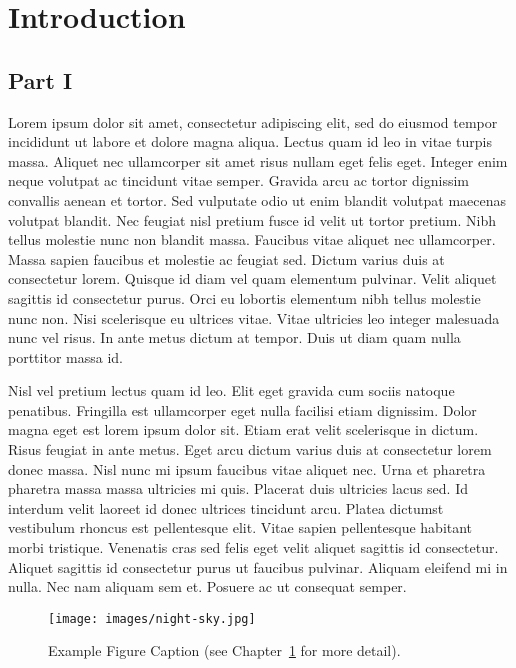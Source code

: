 \documentclass[
  11pt,
  letterpaper,
]{book}
\begin{document}

\hypertarget{sec-intro}{%
\chapter{Introduction}\label{sec-intro}}

\hypertarget{part-i}{%
\section{Part I}\label{part-i}}

Lorem ipsum dolor sit amet, consectetur adipiscing elit, sed do eiusmod
tempor incididunt ut labore et dolore magna aliqua. Lectus quam id leo
in vitae turpis massa. Aliquet nec ullamcorper sit amet risus nullam
eget felis eget. Integer enim neque volutpat ac tincidunt vitae semper.
Gravida arcu ac tortor dignissim convallis aenean et tortor. Sed
vulputate odio ut enim blandit volutpat maecenas volutpat blandit. Nec
feugiat nisl pretium fusce id velit ut tortor pretium. Nibh tellus
molestie nunc non blandit massa. Faucibus vitae aliquet nec ullamcorper.
Massa sapien faucibus et molestie ac feugiat sed. Dictum varius duis at
consectetur lorem. Quisque id diam vel quam elementum pulvinar. Velit
aliquet sagittis id consectetur purus. Orci eu lobortis elementum nibh
tellus molestie nunc non. Nisi scelerisque eu ultrices vitae. Vitae
ultricies leo integer malesuada nunc vel risus. In ante metus dictum at
tempor. Duis ut diam quam nulla porttitor massa id.

Nisl vel pretium lectus quam id leo. Elit eget gravida cum sociis
natoque penatibus. Fringilla est ullamcorper eget nulla facilisi etiam
dignissim. Dolor magna eget est lorem ipsum dolor sit. Etiam erat velit
scelerisque in dictum. Risus feugiat in ante metus. Eget arcu dictum
varius duis at consectetur lorem donec massa. Nisl nunc mi ipsum
faucibus vitae aliquet nec. Urna et pharetra pharetra massa massa
ultricies mi quis. Placerat duis ultricies lacus sed. Id interdum velit
laoreet id donec ultrices tincidunt arcu. Platea dictumst vestibulum
rhoncus est pellentesque elit. Vitae sapien pellentesque habitant morbi
tristique. Venenatis cras sed felis eget velit aliquet sagittis id
consectetur. Aliquet sagittis id consectetur purus ut faucibus pulvinar.
Aliquam eleifend mi in nulla. Nec nam aliquam sem et. Posuere ac ut
consequat semper.

\begin{figure}

{\centering \texttt{[image: images/night-sky.jpg]}

}

\caption{\label{fig-example-1}Example Figure Caption (see
Chapter~\ref{sec-intro} for more detail).}

\end{figure}
\end{document}
